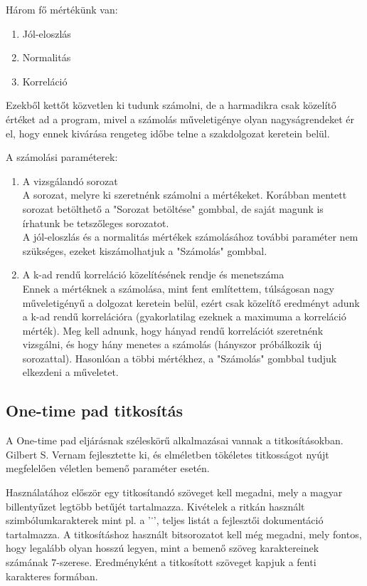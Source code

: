 \documentclass[12pt]{article}
\begin{document}
	Három fő mértékünk van:
	\begin{enumerate}
		\bfseries \item Jól-eloszlás
		\bfseries \item Normalitás 
		\bfseries \item Korreláció
	\end{enumerate}
	Ezekből kettőt közvetlen ki tudunk számolni, de a harmadikra csak közelítő értéket ad a program, mivel a számolás műveletigénye olyan nagyságrendeket ér el, hogy ennek kivárása rengeteg időbe telne a szakdolgozat keretein belül.
	
	A számolási paraméterek:
	\begin{enumerate}
		\bfseries \item A vizsgálandó sorozat \\
		\normalfont A sorozat, melyre ki szeretnénk számolni a mértékeket. Korábban mentett sorozat betölthető a "Sorozat betöltése" gombbal, de saját magunk is írhatunk be tetszőleges sorozatot. \\
		A jól-eloszlás és a normalitás mértékek számolásához további paraméter nem szükséges, ezeket kiszámolhatjuk a "Számolás" gombbal. \\
		\bfseries \item A k-ad rendű korreláció közelítésének rendje és menetszáma \\
		\normalfont Ennek a mértéknek a számolása, mint fent említettem, túlságosan nagy műveletigényű a dolgozat keretein belül, ezért csak közelítő eredményt adunk a k-ad rendű korrelációra (gyakorlatilag ezeknek a maximuma a korreláció mérték). Meg kell adnunk, hogy hányad rendű korrelációt szeretnénk vizsgálni, és hogy hány menetes a számolás (hányszor próbálkozik új sorozattal). Hasonlóan a többi mértékhez, a "Számolás" gombbal tudjuk elkezdeni a műveletet.
	\end{enumerate}
	\subsection{One-time pad titkosítás}
	A One-time pad eljárásnak széleskörű alkalmazásai vannak a titkosításokban. Gilbert S. Vernam fejlesztette ki, és elméletben tökéletes titkosságot nyújt megfelelően véletlen bemenő paraméter esetén.
	
	Használatához először egy titkosítandó szöveget kell megadni, mely a magyar billentyűzet legtöbb betűjét tartalmazza. Kivételek a ritkán használt szimbólumkarakterek mint pl. a '˙', teljes listát a fejlesztői dokumentáció tartalmazza. A titkosításhoz használt bitsorozatot kell még megadni, mely fontos, hogy legalább olyan hosszú legyen, mint a bemenő szöveg karaktereinek számának 7-szerese. Eredményként a titkosított szöveget kapjuk a fenti karakteres formában.
	
\end{document}
